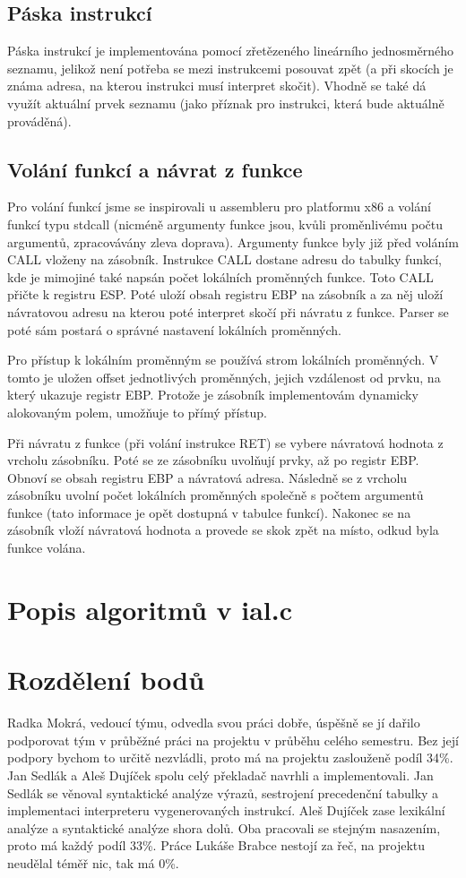 \documentclass[a4paper,11pt,titlepage]{article}
\begin{document}
\subsection{Páska instrukcí}
Páska instrukcí je implementována pomocí zřetězeného lineárního jedno\-směr\-né\-ho seznamu, jelikož není potřeba se mezi instrukcemi posouvat zpět (a při skocích je známa adresa, na kterou instrukci musí interpret skočit). Vhodně se také dá využít aktuální prvek seznamu (jako příznak pro instrukci, která bude aktuálně prováděná).
\subsection{Volání funkcí a návrat z funkce}
Pro volání funkcí jsme se inspirovali u assembleru pro platformu x86 a volání funkcí typu stdcall (nicméně argumenty funkce jsou, kvůli proměnlivému počtu argumentů, zpracovávány zleva doprava). Argumenty funkce byly již před voláním CALL vloženy na zásobník. Instrukce CALL dostane adresu do tabulky funkcí, kde je mimojiné také napsán počet lokálních pro\-měn\-ných funkce. Toto CALL přičte k registru ESP. Poté uloží obsah registru EBP na zásobník a za něj uloží návratovou adresu na kterou poté interpret skočí při návratu z funkce. Parser se poté sám postará o správné nastavení lokálních proměnných.


Pro přístup k lokálním proměnným se používá strom lokálních pro\-měn\-ných. V tomto je uložen offset jednotlivých proměnných, jejich vzdálenost od prvku, na který ukazuje registr EBP. Protože je zásobník implementovám dynamicky alokovaným polem, umožňuje to přímý přístup.


Při návratu z funkce (při volání instrukce RET) se vybere návratová hodnota z vrcholu zásobníku. Poté se ze zásobníku uvolňují prvky, až po registr EBP. Obnoví se obsah registru EBP a návratová adresa. Následně se z vrcholu zásobníku uvolní počet lokálních proměnných společně s počtem argumentů funkce (tato informace je opět dostupná v tabulce funkcí). Nakonec se na zásobník vloží návratová hodnota a provede se skok zpět na místo, odkud byla funkce volána.

\section{Popis algoritmů v ial.c}

\section{Rozdělení bodů}

Radka Mokrá, vedoucí týmu, odvedla svou práci dobře, úspěšně se jí dařilo podporovat tým v průběžné práci na projektu v průběhu celého semestru. Bez její podpory bychom to určitě nezvládli, proto má na projektu zaslouženě podíl 34\%. Jan Sedlák a Aleš Dujíček spolu celý překladač navrhli a implementovali. Jan Sedlák se věnoval syntaktické analýze výrazů, sestrojení precedenční tabulky a implementaci interpreteru vygenerovaných instrukcí. Aleš Dujíček zase lexikální analýze a syntaktické analýze shora dolů. Oba pracovali se stejným nasazením, proto má každý podíl 33\%. Práce Lukáše Brabce nestojí za řeč, na projektu neudělal téměř nic, tak má 0\%.
\end{document}
